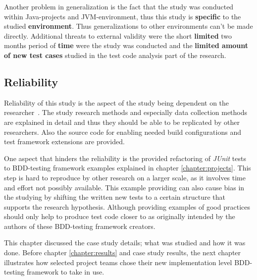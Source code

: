 Another problem in generalization is the fact that the study was conducted within Java-projects and JVM-environment, thus this
study is \textbf{specific} to the studied \textbf{environment}. Thus generalizations to other environments can't be made directly.
Additional threats to external validity were the short
\textbf{limited} two months period of \textbf{time} were the study was conducted and the \textbf{limited amount of new test cases} studied
in the test code analysis part of the research.

\subsection{Reliability}
Reliability of this study is the aspect of the study being dependent on the researcher~\cite{runeson2012case}. The study
research methods and especially data collection methods are explained in detail and thus they should be able to be replicated by other researchers.
Also the source code for enabling needed build configurations and test framework extensions are provided.

One aspect that hinders the reliability is the provided refactoring of \textit{JUnit} tests to BDD-testing framework examples explained
in chapter \ref{chapter:projects}. This step is hard to reproduce by other research on a larger scale, as it involves time and effort not
possibly available. This example providing can also cause bias in the studying by
shifting the written new tests to a certain structure that supports the research hypothesis. Although providing examples
of good practices should only help to produce test code closer to as originally intended by the authors of these BDD-testing framework creators.

This chapter discussed the case study details; what was studied and how it was done. Before chapter \ref{chapter:results} and case study results,
the next chapter illustrates how selected project teams chose their new implementation level BDD-testing framework to take in use.



